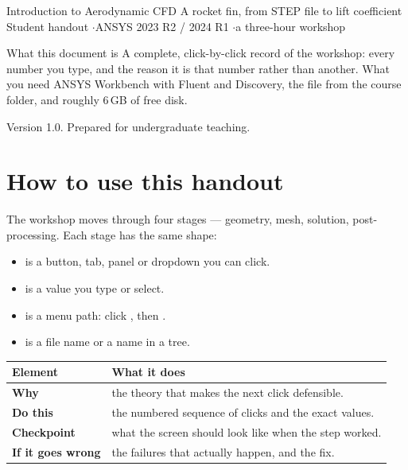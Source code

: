 \documentclass[10pt,a4paper]{article}
\begin{document}
\ShefDocTitle
  {Introduction to Aerodynamic CFD}
  {A rocket fin, from STEP file to lift coefficient}
  {Student handout \quad$\cdot$\quad ANSYS 2023 R2 / 2024 R1 \quad$\cdot$\quad a three-hour workshop}

\ShefDocIntro
  {What this document is}
  {A complete, click-by-click record of the workshop: every number you type,
   and the reason it is that number rather than another.}
  {What you need}
  {ANSYS Workbench with Fluent and Discovery, the file  from
   the course folder, and roughly 6\,GB of free disk.}

\vfill
{\footnotesize\color{MidGrey}
 Version 1.0. Prepared for undergraduate teaching.\par}
\clearpage

\section*{How to use this handout}

The workshop moves through four stages --- geometry, mesh, solution,
post-processing. Each stage has the same shape:

\begin{itemize}
  \item {} is a button, tab, panel or dropdown you can click.
  \item {} is a value you type or select.
  \item {} is a menu path: click , then
    .
  \item {} is a file name or a name in a tree.
\end{itemize}

\begin{center}
\small
\begin{tabular}{@{}L{0.17\textwidth}L{0.74\textwidth}@{}}
\toprule
\textbf{Element} & \textbf{What it does}\\
\midrule
\textbf{Why} & the theory that makes the next click defensible.\\
\textbf{Do this} & the numbered sequence of clicks and the exact values.\\
\textbf{Checkpoint} & what the screen should look like when the step worked.\\
\textbf{If it goes wrong} & the failures that actually happen, and the fix.\\
\bottomrule
\end{tabular}
\end{center}
\end{document}
